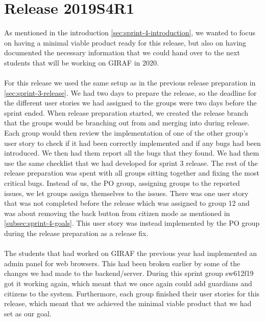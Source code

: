 \section{Release 2019S4R1}
As mentioned in the introduction \autoref{sec:sprint-4-introduction}, we wanted to focus on having a minimal viable product ready for this release, but also on having documented the necessary information that we could hand over to the next students that will be working on GIRAF in 2020.
\\\\
For this release we used the same setup as in the previous release preparation in \autoref{sec:sprint-3-release}. 
We had two days to prepare the release, so the deadline for the different user stories we had assigned to the groups were two days before the sprint ended. When release preparation started, we created the release branch that the groups would be branching out from and merging into during release. Each group would then review the implementation of one of the other group's user story to check if it had been correctly implemented and if any bugs had been introduced. We then had them report all the bugs that they found. We had them use the same checklist that we had developed for sprint 3 release. The rest of the release preparation was spent with all groups sitting together and fixing the most critical bugs. Instead of us, the PO group, assigning groups to the reported issues, we let groups assign themselves to the issues.
There was one user story that was not completed before the release which  was assigned to group 12 and was about removing the back button from citizen mode as mentioned in \autoref{subsec:sprint-4-goals}. This user story was instead implemented by the PO group during the release preparation as a release fix. 
\\\\
The students that had worked on GIRAF the previous year had implemented an admin panel for web browsers. This had been broken earlier by some of the changes we had made to the backend/server. During this sprint group sw612f19 got it working again, which meant that we once again could add guardians and citizens to the system. 
Furthermore, each group finished their user stories for this release, which meant that we achieved the minimal viable product that we had set as our goal. 
